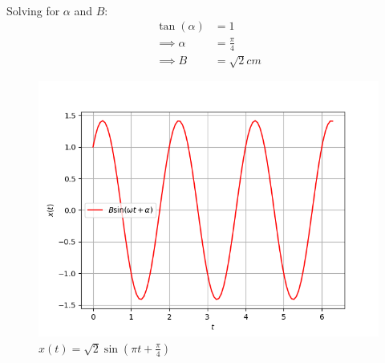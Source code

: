 \documentclass[journal,12pt,twocolumn]{IEEEtran}
\theoremstyle{remark}
\begin{document}
\begin{enumerate}
\begin{align}
\end{align}
Solving for $\alpha$ and $B$:
\begin{align}
    \tan(\alpha)& = 1\\
\implies
\alpha &= \frac{\pi}{4} \\
\implies 
B &=\sqrt{2}cm
\end{align}
\begin{figure}[h]
\renewcommand\thefigure{2}
    \centering
    \includegraphics[width=0.8\columnwidth]{figs/fig2.png}
    \caption{$x(t) = \sqrt{2}\sin(\pi t + \frac{\pi}{4})$}
    \label{Fig2_11.14.7}
\end{figure}
\end{enumerate}
\end{document}
